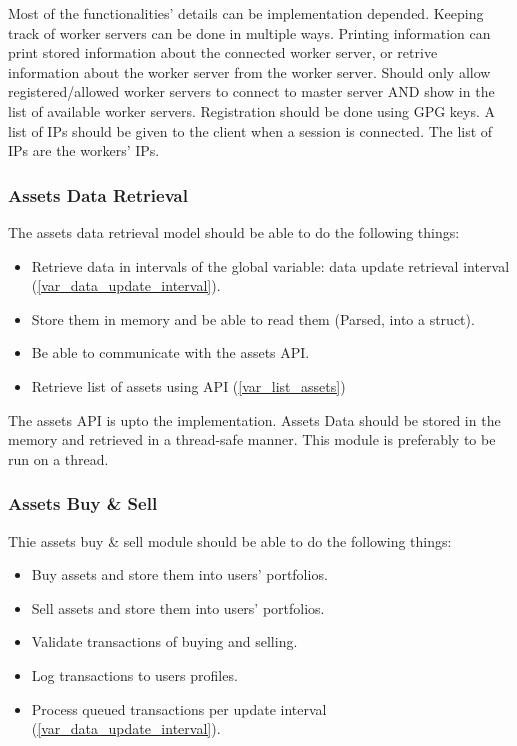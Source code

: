 \documentclass[a4paper]{article}
\begin{document}
Most of the functionalities' details can be implementation depended. Keeping
track of worker servers can be done in multiple ways. Printing information can
print stored information about the connected worker server, or retrive 
information about the worker server from the worker server. Should only allow
registered/allowed worker servers to connect to master server AND show in the 
list of available worker servers. Registration should be done using GPG keys.
A list of IPs should be given to the client when a session is connected. The 
list of IPs are the workers' IPs.

\subsubsection{Assets Data Retrieval}
\label{master_mods_assets}
The assets data retrieval model should be able to do the following things:
\begin{itemize}
	\item Retrieve data in intervals of the global variable: data update 
		retrieval interval (\ref{var_data_update_interval}).
	\item Store them in memory and be able to read them (Parsed, into a 
		struct).
	\item Be able to communicate with the assets API.
	\item Retrieve list of assets using API (\ref{var_list_assets})
\end{itemize}

The assets API is upto the implementation. Assets Data should be stored in the
memory and retrieved in a thread-safe manner. This module is preferably to be 
run on a thread.

\subsubsection{Assets Buy \& Sell}
\label{master_mods_buysell}
Thie assets buy \& sell module should be able to do the following things:
\begin{itemize}
	\item Buy assets and store them into users' portfolios.
	\item Sell assets and store them into users' portfolios.
	\item Validate transactions of buying and selling.
	\item Log transactions to users profiles.
	\item Process queued transactions per update interval 
		(\ref{var_data_update_interval}).
\end{itemize}
\end{document}
